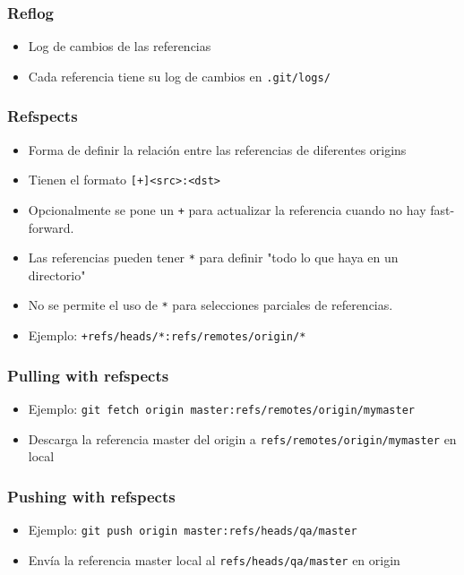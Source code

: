 \documentclass[10pt]{beamer}
\begin{document}
  \begin{frame}[containsverbatim]
    \frametitle{Reflog}
    \begin{itemize}
        \item Log de cambios de las referencias
        \item Cada referencia tiene su log de cambios en \verb+.git/logs/+
    \end{itemize}
  \end{frame}

  \begin{frame}[containsverbatim]
    \frametitle{Refspects}
    \begin{itemize}
        \item Forma de definir la relación entre las referencias de diferentes origins
        \item Tienen el formato \verb$[+]<src>:<dst>$
        \item Opcionalmente se pone un \verb$+$ para actualizar la referencia cuando no hay fast-forward.
        \item Las referencias pueden tener \verb$*$ para definir "todo lo que haya en un directorio"
        \item No se permite el uso de \verb$*$ para selecciones parciales de referencias.
        \item Ejemplo: \verb$+refs/heads/*:refs/remotes/origin/*$
    \end{itemize}
  \end{frame}

  \begin{frame}[containsverbatim]
    \frametitle{Pulling with refspects}
    \begin{itemize}
        \item Ejemplo: \verb$git fetch origin master:refs/remotes/origin/mymaster$
        \item Descarga la referencia master del origin a \verb$refs/remotes/origin/mymaster$ en local
    \end{itemize}
  \end{frame}

  \begin{frame}[containsverbatim]
    \frametitle{Pushing with refspects}
    \begin{itemize}
        \item Ejemplo: \verb$git push origin master:refs/heads/qa/master$
        \item Envía la referencia master local al \verb$refs/heads/qa/master$ en origin
    \end{itemize}
  \end{frame}
\end{document}

